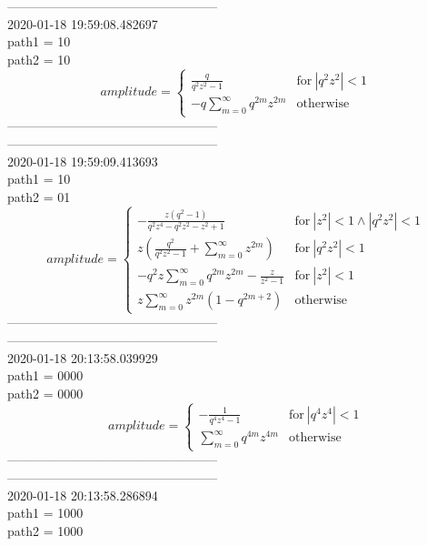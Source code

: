\documentclass{jsreport}
\begin{document}
--------------------------------------------------\\
2020-01-18 19:59:08.482697\\
path1 = 10\\
path2 = 10\\
$$amplitude = \begin{cases} \frac{q}{q^{2} z^{2} - 1} & \text{for}\: \left|{q^{2} z^{2}}\right| < 1 \\- q \sum_{m=0}^{\infty} q^{2 m} z^{2 m} & \text{otherwise} \end{cases}$$
--------------------------------------------------\\
--------------------------------------------------\\
2020-01-18 19:59:09.413693\\
path1 = 10\\
path2 = 01\\
$$amplitude = \begin{cases} - \frac{z \left(q^{2} - 1\right)}{q^{2} z^{4} - q^{2} z^{2} - z^{2} + 1} & \text{for}\: \left|{z^{2}}\right| < 1 \wedge \left|{q^{2} z^{2}}\right| < 1 \\z \left(\frac{q^{2}}{q^{2} z^{2} - 1} + \sum_{m=0}^{\infty} z^{2 m}\right) & \text{for}\: \left|{q^{2} z^{2}}\right| < 1 \\- q^{2} z \sum_{m=0}^{\infty} q^{2 m} z^{2 m} - \frac{z}{z^{2} - 1} & \text{for}\: \left|{z^{2}}\right| < 1 \\z \sum_{m=0}^{\infty} z^{2 m} \left(1 - q^{2 m + 2}\right) & \text{otherwise} \end{cases}$$
--------------------------------------------------\\
--------------------------------------------------\\
2020-01-18 20:13:58.039929\\
path1 = 0000\\
path2 = 0000\\
$$amplitude = \begin{cases} - \frac{1}{q^{4} z^{4} - 1} & \text{for}\: \left|{q^{4} z^{4}}\right| < 1 \\\sum_{m=0}^{\infty} q^{4 m} z^{4 m} & \text{otherwise} \end{cases}$$
--------------------------------------------------\\
--------------------------------------------------\\
2020-01-18 20:13:58.286894\\
path1 = 1000\\
path2 = 1000\\
\end{document}
